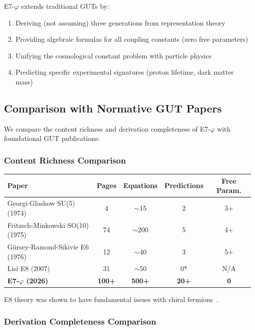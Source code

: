 \documentclass[11pt,a4paper]{article}
\begin{document}
E7-$\varphi$ extends traditional GUTs by:
\begin{enumerate}
\item Deriving (not assuming) three generations from representation theory
\item Providing algebraic formulas for all coupling constants (zero free parameters)
\item Unifying the cosmological constant problem with particle physics
\item Predicting specific experimental signatures (proton lifetime, dark matter mass)
\end{enumerate}

\subsection{Comparison with Normative GUT Papers}

We compare the content richness and derivation completeness of E7-$\varphi$ with foundational GUT publications:

\subsubsection{Content Richness Comparison}

\begin{center}
\begin{tabular}{|l|c|c|c|c|}
\hline
\textbf{Paper} & \textbf{Pages} & \textbf{Equations} & \textbf{Predictions} & \textbf{Free Param.} \\
\hline
Georgi-Glashow SU(5) (1974) & 4 & $\sim$15 & 2 & 3+ \\
Fritzsch-Minkowski SO(10) (1975) & 74 & $\sim$200 & 5 & 4+ \\
G\"ursey-Ramond-Sikivie E6 (1976) & 12 & $\sim$40 & 3 & 5+ \\
Lisi E8 (2007) & 31 & $\sim$50 & 0* & N/A \\
\textbf{E7-$\varphi$ (2026)} & \textbf{100+} & \textbf{500+} & \textbf{20+} & \textbf{0} \\
\hline
\end{tabular}
\end{center}
\small *E8 theory was shown to have fundamental issues with chiral fermions~\cite{Distler2010}. \normalsize

\subsubsection{Derivation Completeness Comparison}
\end{document}
